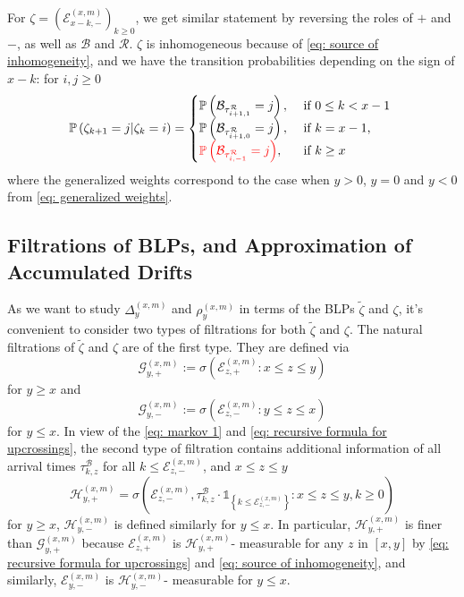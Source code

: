 \documentclass[twoside,12pt, a4paper]{article}
\numberwithin{equation}{section}
\theoremstyle{remark}
\newcommand{\edt}[1]{\textcolor{red}{#1}} %
\begin{document}
	For $\zeta= \left(\mathcal{E}^{(x,m)}_{x-k,-} \right)_{k\geq 0}$, we get similar statement by reversing the roles of $+$ and $-$, as well as $\mathcal{B}$ and $\mathcal{R}$. $\zeta$ is inhomogeneous because of \eqref{eq: source of inhomogeneity}, and we have the transition probabilities depending on the sign of $x-k$: for $i,j\geq 0$
	\begin{equation}\label{eq: transition prob on negative}
		\mathbb{P}\left(\zeta_{k+1}=j \vert \zeta_k =i  \right) = 
		\begin{cases}
			\mathbb{P}\left( \mathcal{B}_{\tau_{i+1,1}^{\mathcal{R}}} = j \right) ,& \mbox{ if $0 \leq k <  x-1$ }
			\\
			\mathbb{P}\left( \mathcal{B}_{\tau_{i+1,0}^{\mathcal{R}}} = j \right) ,& \mbox{ if $k =  x-1$, }
			\\
		\edt{	\mathbb{P}\left( \mathcal{B}_{\tau_{i,-1}^{\mathcal{R}}} = j \right) },& \mbox{ if $k \geq x$ }
		\end{cases}
	\end{equation}
	where the generalized weights correspond to the case when $y>0$, $y=0$ and $y<0$ from \eqref{eq: generalized weights}.
	
	\subsection{Filtrations of BLPs, and Approximation of Accumulated Drifts}\label{subsec: measurability}
	
	As we want to study $\Delta^{(x,m)}_{y}$ and $\rho^{(x,m)}_{y}$ in terms of the BLPs $\tilde{\zeta}$ and $\zeta$, it's convenient to consider two types of filtrations for both $\tilde{\zeta}$ and $\zeta$. The natural filtrations of $\tilde{\zeta}$ and $\zeta$ are of the first type. They are defined via 
	$$\mathcal{G}_{y, +}^{(x,m)}:=\sigma\left(\mathcal{E}^{(x,m)}_{z, +}: x \le z \le y\right) $$ for $y \ge x$ and $$\mathcal{G}_{y, -}^{(x,m)}:=\sigma\left(\mathcal{E}^{(x,m)}_{z, -}: y \le z \le x\right) $$ for $y \le x$.
	In view of the \eqref{eq: markov 1} and \eqref{eq: recursive formula for upcrossings},
	the second type of filtration contains additional information of all arrival times $\tau^\mathcal{B}_{k,z}$ for all $k\leq \mathcal{E}^{(x,m)}_{z, -}$, and $x\leq z \leq y$
	\[
	\mathcal{H}_{y, +}^{(x,m)} = \sigma\left( \mathcal{E}_{z, -}^{(x,m)}, \tau_{k, z}^\mathcal{B}\cdot \mathbb{1}_{\left\{ k\leq \mathcal{E}_{z, -}^{(x,m)} \right\}} : x \leq  z \leq y,  k \geq 0 \right) 
	\]
	for $y\geq x$, $\mathcal{H}_{y, -}^{(x,m)}$ is defined similarly for $y\leq x$.
	In particular, $\mathcal{H}_{y, +}^{(x,m)}$ is finer than $\mathcal{G}_{y, +}^{(x,m)}$ because $\mathcal{E}_{z, +}^{(x,m)}$ is $\mathcal{H}_{y, +}^{(x,m)}$- measurable for any $z$ in $[x,y]$ by \eqref{eq: recursive formula for upcrossings} and \eqref{eq: source of inhomogeneity}, and similarly, $\mathcal{E}_{y, -}^{(x,m)}$ is $\mathcal{H}_{y, -}^{(x,m)}$- measurable for $ y\leq x$. 
	
\end{document}
